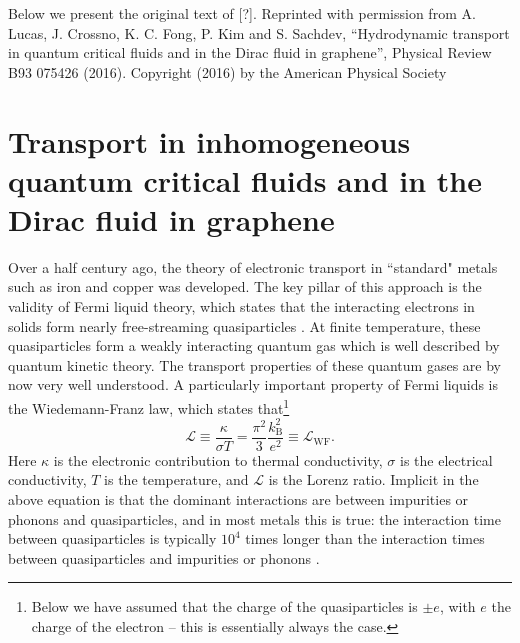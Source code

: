 Below we present the original text of [?]. Reprinted with permission from A. Lucas, J. Crossno, K. C. Fong, P. Kim and S. Sachdev, “Hydrodynamic transport in quantum critical fluids and in the Dirac fluid in graphene”, Physical Review B93 075426 (2016). Copyright (2016) by the American Physical Society

\section{Transport in inhomogeneous quantum critical fluids and in the Dirac fluid in graphene}
Over a half century ago, the theory of electronic transport in ``standard" metals such as iron and copper was developed.  The key pillar of this approach is the validity of Fermi liquid theory, which states that the interacting electrons in solids form nearly free-streaming quasiparticles \cite{pines_theory_1994}.  At finite temperature, these quasiparticles form a weakly interacting quantum gas which is well described by quantum kinetic theory.   The transport properties of these quantum gases are by now very well understood.   A particularly important property of Fermi liquids is the Wiedemann-Franz law, which states that\footnote{Below we have assumed that the charge of the quasiparticles is $\pm e$, with $e$ the charge of the electron -- this is essentially always the case.} \begin{equation}
\mathcal{L} \equiv \frac{\kappa}{\sigma T} = \frac{\pi^2}{3} \frac{k_{\mathrm{B}}^2}{e^2} \equiv \mathcal{L}_{\mathrm{WF}}.
\end{equation}
Here $\kappa$ is the electronic contribution to thermal conductivity, $\sigma$ is the electrical conductivity, $T$ is the temperature, and $\mathcal{L}$ is the Lorenz ratio.   Implicit in the above equation is that the dominant interactions are between impurities or phonons and quasiparticles, and in most metals this is true:  the interaction time between quasiparticles is typically $10^4$ times longer than the interaction times between quasiparticles and impurities or phonons \cite{ashcroft_solid_1976}.   

